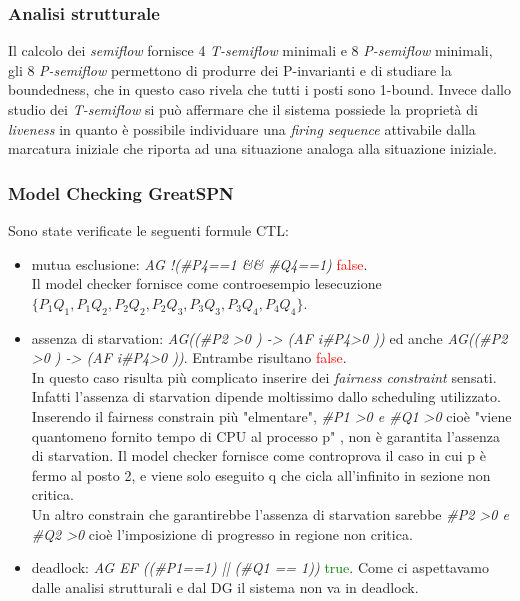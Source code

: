\documentclass[a4paper]{article}
\begin{document}
\subsubsection{Analisi strutturale}
Il calcolo dei \textit{semiflow} fornisce 4 \textit{T-semiflow} minimali e 8 \textit{P-semiflow} minimali, gli 8 \textit{P-semiflow} permettono di produrre dei P-invarianti e di studiare la boundedness, che in questo caso rivela che tutti i posti sono 1-bound.
Invece dallo studio dei \textit{T-semiflow} si può affermare che il sistema possiede la proprietà di \textit{liveness} in quanto è possibile individuare una \textit{ﬁring sequence} attivabile dalla marcatura iniziale che riporta ad una situazione analoga alla situazione iniziale. %

\subsubsection{Model Checking GreatSPN}
Sono state verificate le seguenti formule CTL:
\begin{itemize}
	\item mutua esclusione: \textit{AG !(\#P4==1 \&\& \#Q4==1)} \textcolor{red}{false}.\\
		Il model checker fornisce come controesempio lesecuzione $\{P_1 Q_1,P_1 Q_2,P_2 Q_2,P_2 Q_3,P_3 Q_3,P_3 Q_4,P_4 Q_4\}$.
	\item assenza di starvation: \textit{AG((\#P2 >0 ) -> (AF i\#P4>0 ))} ed anche \textit{AG((\#P2 >0 ) -> (AF i\#P4>0 ))}. Entrambe risultano \textcolor{red}{false}.\\
		In questo caso risulta più complicato inserire dei \textit{fairness constraint} sensati. Infatti l'assenza di starvation dipende moltissimo dallo scheduling utilizzato.  
		Inserendo il fairness constrain più "elmentare", \textit{\#P1 >0 \textit{e} \#Q1 >0} cioè "viene quantomeno fornito tempo di CPU al processo p" , non è garantita l'assenza di starvation. Il model checker fornisce come controprova il caso in cui p è fermo al posto 2, e viene solo eseguito q che cicla all'infinito in sezione non critica.\\ %
		Un altro constrain che garantirebbe l'assenza di starvation sarebbe \textit{\#P2 >0 \textit{e} \#Q2 >0} cioè l'imposizione di progresso in regione non critica.%
	\item deadlock: \textit{AG EF ((\#P1==1) || (\#Q1 == 1))} \textcolor{green}{true}. Come ci aspettavamo dalle analisi strutturali e dal DG il sistema non va in deadlock.
\end{itemize}
\end{document}
